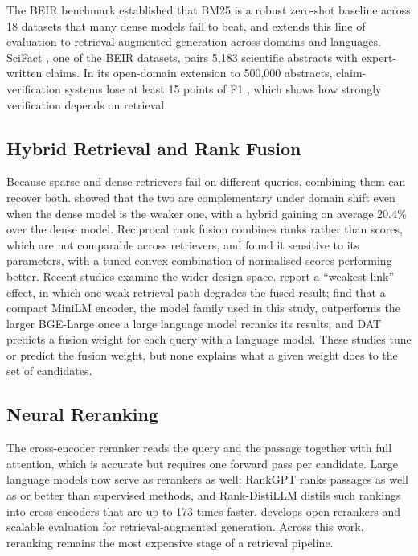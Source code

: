 The BEIR benchmark \parencite{thakur2021beir} established that BM25 is a robust zero-shot
baseline across 18 datasets that many dense models fail to beat, and \textcite{thakur2026thesis}
extends this line of evaluation to retrieval-augmented generation across domains and languages.
SciFact \parencite{wadden2020scifact}, one of the BEIR datasets, pairs 5,183 scientific
abstracts with expert-written claims. In its open-domain extension to 500,000 abstracts,
claim-verification systems lose at least 15 points of F1 \parencite{wadden2022scifactopen},
which shows how strongly verification depends on retrieval.

\subsection{Hybrid Retrieval and Rank Fusion}
\label{sec:lit-hybrid}

Because sparse and dense retrievers fail on different queries, combining them can recover
both. \textcite{chen2022hybrid} showed that the two are complementary under domain shift even
when the dense model is the weaker one, with a hybrid gaining on average 20.4\% over the dense
model. Reciprocal rank fusion \parencite{cormack2009rrf} combines ranks rather than scores,
which are not comparable across retrievers, and \textcite{bruch2024fusion} found it sensitive to
its parameters, with a tuned convex combination of normalised scores performing better.
Recent studies examine the wider design space. \textcite{wang2026blend} report a ``weakest
link'' effect, in which one weak retrieval path degrades the fused result;
\textcite{rao2025rethinking} find that a compact MiniLM encoder, the model family used in this
study, outperforms the larger BGE-Large once a large language model reranks its results; and
DAT \parencite{hsu2025dat} predicts a fusion weight for each query with a language model. These
studies tune or predict the fusion weight, but none explains what a given weight does to the
set of candidates.

\subsection{Neural Reranking}
\label{sec:lit-rerank}

The cross-encoder reranker \parencite{nogueira2019passage} reads the query and the passage
together with full attention, which is accurate but requires one forward pass per candidate.
Large language models now serve as rerankers as well: RankGPT \parencite{sun2023rankgpt} ranks
passages as well as or better than supervised methods, and Rank-DistiLLM
\parencite{schlatt2025rankdistillm} distils such rankings into cross-encoders that are up to 173
times faster. \textcite{pradeep2025thesis} develops open rerankers and scalable evaluation for
retrieval-augmented generation. Across this work, reranking remains the most expensive stage of
a retrieval pipeline.

